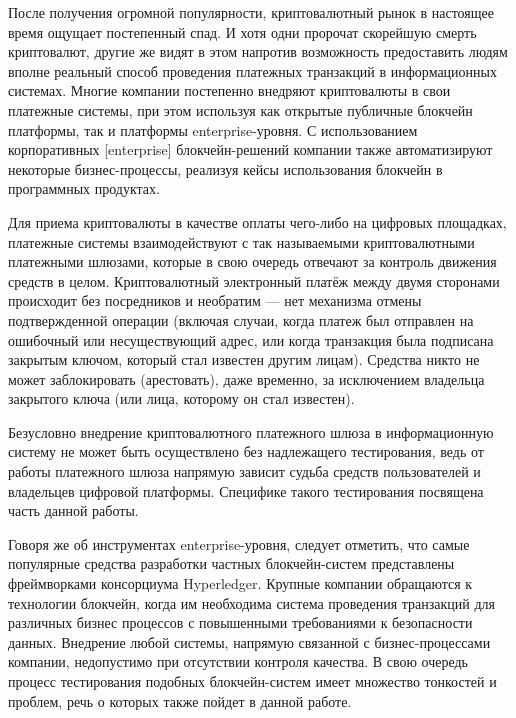
{\actuality} После получения огромной популярности, криптовалютный рынок в настоящее время ощущает постепенный спад. И хотя одни пророчат скорейшую смерть криптовалют, другие же видят в этом напротив возможность предоставить людям вполне реальный способ проведения платежных транзакций в информационных системах. Многие компании постепенно внедряют
криптовалюты в свои платежные системы, при этом используя как открытые публичные блокчейн платформы, так и платформы enterprise-уровня. С использованием корпоративных [enterprise] блокчейн-решений компании также автоматизируют некоторые бизнес-процессы, реализуя кейсы использования блокчейн в программных продуктах.

Для приема криптовалюты в качестве оплаты чего-либо на цифровых площадках, платежные системы взаимодействуют с так называемыми криптовалютными платежными шлюзами, которые в свою очередь отвечают за контроль движения средств в целом. Криптовалютный электронный платёж между двумя сторонами происходит без посредников и необратим — нет механизма отмены подтвержденной операции (включая случаи, когда платеж был отправлен на ошибочный или несуществующий адрес, или когда транзакция была подписана закрытым ключом, который стал известен другим лицам). Средства никто не может заблокировать (арестовать), даже временно, за исключением владельца закрытого ключа (или лица, которому он стал известен).

Безусловно внедрение криптовалютного платежного шлюза в информационную систему не может быть осуществлено без надлежащего тестирования, ведь от работы платежного шлюза напрямую зависит судьба средств пользователей и владельцев цифровой платформы. Специфике такого тестирования посвящена часть данной работы.

Говоря же об инструментах enterprise-уровня, следует отметить, что самые популярные средства разработки частных блокчейн-систем представлены фреймворками консорциума Hyperledger. Крупные компании обращаются к технологии блокчейн, когда им необходима система проведения транзакций для различных бизнес процессов с повышенными требованиями к безопасности данных. Внедрение любой системы, напрямую связанной с бизнес-процессами компании, недопустимо при отсутствии контроля качества. В свою очередь процесс тестирования подобных блокчейн-систем имеет множество тонкостей и проблем, речь о которых также пойдет в данной работе.

